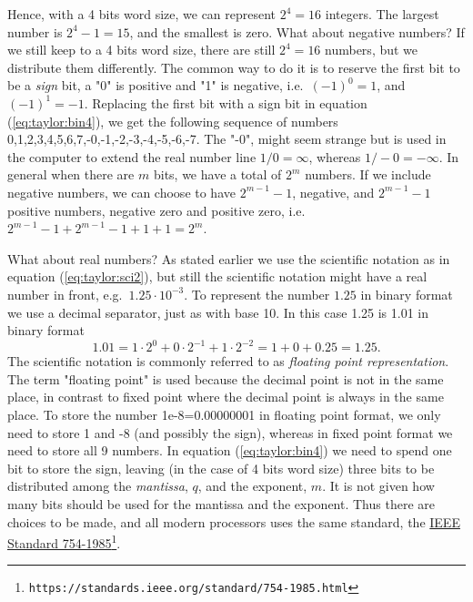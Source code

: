 \documentclass[graybox,sectrefs,envcountresetchap,open=right,final]{svmonodo}
\begin{document}
Hence, with a 4 bits word size, we can represent $2^4=16$ integers. The largest number is $2^4-1=15$, and the smallest is zero. What about negative numbers? If we still keep to a 4 bits word size, there are still $2^4=16$ numbers, but we distribute them differently. The common way to do it is to reserve the first bit to be a \emph{sign} bit, a "0" is positive and "1" is negative, i.e.~$(-1)^0 = 1$, and $(-1)^1=-1$. Replacing the first bit with a sign bit in equation (\ref{eq:taylor:bin4}), we get the following sequence of numbers 0,1,2,3,4,5,6,7,-0,-1,-2,-3,-4,-5,-6,-7. The "-0", might seem strange but is used in the computer to extend the real number line $1/0=\infty$, whereas $1/-0=-\infty$. In general when there are $m$ bits, we have a total of $2^m$ numbers. If we include negative numbers, we can choose to have $2^{m-1}-1$, negative, and $2^{m-1}-1$ positive numbers, negative zero and positive zero, i.e.~$2^{m-1}-1+2^{m-1}-1+1+1=2^m$.

What about real numbers? As stated earlier we use the scientific notation as in equation (\ref{eq:taylor:sci2}), but still the scientific notation might have a real number in front, e.g.~$1.25\cdot 10^{-3}$. To represent the number $1.25$ in binary format we use a decimal separator, just as with base 10. In this case 1.25 is 1.01 in binary format
\begin{equation}
1.01=1\cdot 2^0 + 0\cdot 2^{-1}+1\cdot 2^{-2}=1 + 0 + 0.25=1.25.
\label{eq:taylor:b2fr}
\end{equation}
The scientific notation is commonly referred to as \emph{floating point representation}. The term "floating point" is used because the decimal point is not in the same place, in contrast to fixed point where the decimal point is always in the same place. To store the number 1e-8=0.00000001 in floating point format, we only need to store 1 and -8 (and possibly the sign), whereas in fixed point format we need to store all 9 numbers.  In equation (\ref{eq:taylor:bin4}) we need to spend one bit to store the sign, leaving (in the case of 4 bits word size) three bits to be distributed among the \emph{mantissa}, $q$, and the exponent, $m$. It is not given how many bits should be used for the mantissa and the exponent. Thus there are choices to be made, and all modern processors uses the same standard, the \href{{https://standards.ieee.org/standard/754-1985.html}}{IEEE Standard 754-1985}\footnote{\texttt{https://standards.ieee.org/standard/754-1985.html}}. 
\end{document}
